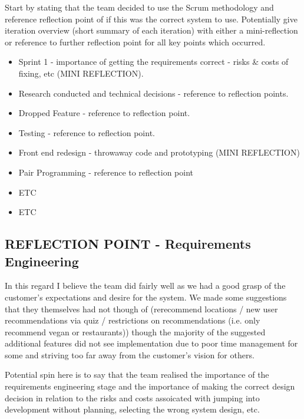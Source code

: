 \documentclass{l3proj}
\begin{document}
Start by stating that the team decided to use the Scrum methodology and reference reflection point of if this was the correct system to use. Potentially give iteration overview (short summary of each iteration) with either a mini-reflection or reference to further reflection point for all key points which occurred.
\begin{itemize}
\item Sprint 1 - importance of getting the requirements correct - risks \& costs of fixing, etc (MINI REFLECTION).
\item Research conducted and technical decisions - reference to reflection points.
\item Dropped Feature - reference to reflection point.
\item Testing - reference to reflection point.
\item Front end redesign - throwaway code and prototyping (MINI REFLECTION)
\item Pair Programming - reference to reflection point 
\item ETC
\item ETC
\end{itemize}


\subsection{REFLECTION POINT - Requirements Engineering}
\label{sec:teamstructure}

In this regard I believe the team did fairly well as we had a good grasp of the customer's expectations and desire for the system. We made some suggestions that they themselves had not though of (rerecommend locations / new user recommendations via quiz / restrictions on recommendations (i.e. only recommend vegan or restaurants)) though the majority of the suggested additional features did not see implementation due to poor time management for some and striving too far away from the customer's vision for others.

Potential spin here is to say that the team realised the importance of the requirements engineering stage and the importance of making the correct design decision in relation to the risks and costs assoicated with jumping into development without planning, selecting the wrong system design, etc.
\end{document}
